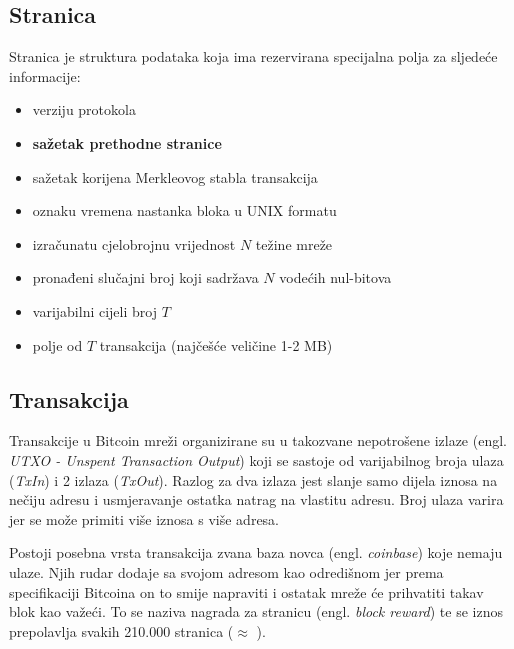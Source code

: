 \documentclass[utf8, zavrsni]{fer}
\begin{document}
\subsection{Stranica}
Stranica je struktura podataka koja ima rezervirana specijalna polja za sljedeće informacije:
\begin{itemize}
    \item verziju protokola
    \item \textbf{sažetak prethodne stranice}
    \item sažetak korijena Merkleovog stabla transakcija
    \item oznaku vremena nastanka bloka u UNIX formatu
    \item izračunatu cjelobrojnu vrijednost $ N $ težine mreže
    \item pronađeni slučajni broj koji sadržava $ N $ vodećih nul-bitova
    \item varijabilni cijeli broj $ T $
    \item polje od $ T $ transakcija (najčešće veličine 1-2 MB)
\end{itemize}

\subsection{Transakcija}
Transakcije u Bitcoin mreži organizirane su u takozvane nepotrošene izlaze (engl. \textit{UTXO - Unspent Transaction Output}) koji se sastoje od varijabilnog broja ulaza (\textit{TxIn}) i 2 izlaza (\textit{TxOut}). Razlog za dva izlaza jest slanje samo dijela iznosa na nečiju adresu i usmjeravanje ostatka natrag na vlastitu adresu. Broj ulaza varira jer se može primiti više iznosa s više adresa.

\label{block_reward}
Postoji posebna vrsta transakcija zvana baza novca (engl. \textit{coinbase}) koje nemaju ulaze. Njih rudar dodaje sa svojom adresom kao odredišnom jer prema specifikaciji Bitcoina on to smije napraviti i ostatak mreže će prihvatiti takav blok kao važeći. To se naziva nagrada za stranicu (engl. \textit{block reward}) te se iznos prepolavlja svakih 210.000 stranica ($\approx$ ).

\end{document}
